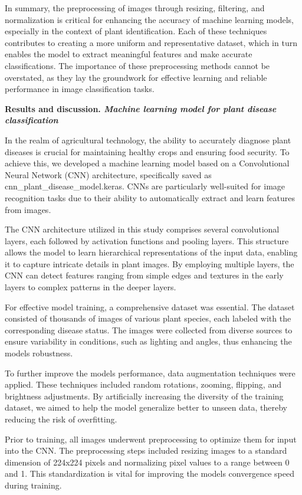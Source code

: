 \documentclass[
]{article}
\begin{document}
In summary, the preprocessing of images through resizing, filtering, and
normalization is critical for enhancing the accuracy of machine learning
models, especially in the context of plant identification. Each of these
techniques contributes to creating a more uniform and representative
dataset, which in turn enables the model to extract meaningful features
and make accurate classifications. The importance of these preprocessing
methods cannot be overstated, as they lay the groundwork for effective
learning and reliable performance in image classification tasks.

\textbf{Results and discussion. \emph{Machine learning model for plant
disease classification}}

In the realm of agricultural technology, the ability to accurately
diagnose plant diseases is crucial for maintaining healthy crops and
ensuring food security. To achieve this, we developed a machine learning
model based on a Convolutional Neural Network (CNN) architecture,
specifically saved as cnn\_plant\_disease\_model.keras. CNNs are
particularly well-suited for image recognition tasks due to their
ability to automatically extract and learn features from images.

The CNN architecture utilized in this study comprises several
convolutional layers, each followed by activation functions and pooling
layers. This structure allows the model to learn hierarchical
representations of the input data, enabling it to capture intricate
details in plant images. By employing multiple layers, the CNN can
detect features ranging from simple edges and textures in the early
layers to complex patterns in the deeper layers.

For effective model training, a comprehensive dataset was essential. The
dataset consisted of thousands of images of various plant species, each
labeled with the corresponding disease status. The images were collected
from diverse sources to ensure variability in conditions, such as
lighting and angles, thus enhancing the model\textquotesingle s
robustness.

To further improve the model\textquotesingle s performance, data
augmentation techniques were applied. These techniques included random
rotations, zooming, flipping, and brightness adjustments. By
artificially increasing the diversity of the training dataset, we aimed
to help the model generalize better to unseen data, thereby reducing the
risk of overfitting.

Prior to training, all images underwent preprocessing to optimize them
for input into the CNN. The preprocessing steps included resizing images
to a standard dimension of 224x224 pixels and normalizing pixel values
to a range between 0 and 1. This standardization is vital for improving
the model\textquotesingle s convergence speed during training.
\end{document}
